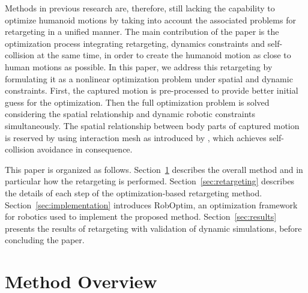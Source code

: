 \documentclass[letterpaper, 10 pt, conference]{ieeeconf}  %
\begin{document}
Methods in previous research are, therefore, still lacking the
capability to optimize humanoid motions by taking into account
the associated problems for retargeting in a unified manner.
The main contribution of the paper is the optimization process
integrating retargeting, dynamics constraints and self-collision at
the same time, 
in order to create the humanoid motion as close to human motions as
possible. 
In this paper, we address this retargeting by formulating it
as a nonlinear optimization problem under spatial and dynamic
constraints.
First, the captured motion is pre-processed to provide better initial
guess for the optimization.
Then the full optimization problem is solved
considering the spatial relationship and dynamic robotic constraints
simultaneously.  
The spatial relationship between body parts of captured motion is
reserved by using interaction mesh as introduced by \cite{Komura10},
which achieves self-collision avoidance in consequence. 


This paper is organized as follows. Section~\ref{sec:overview}
describes the overall method and in particular how the retargeting
is performed. Section~\ref{sec:retargeting} describes the
details of each step of the optimization-based retargeting method.
Section~\ref{sec:implementation} introduces 
RobOptim, an optimization framework for robotics used to implement the
proposed method. Section~\ref{sec:results} presents the results of
retargeting with validation of dynamic simulations, before concluding
the paper.

\section{Method Overview}
\label{sec:overview}
\end{document}
